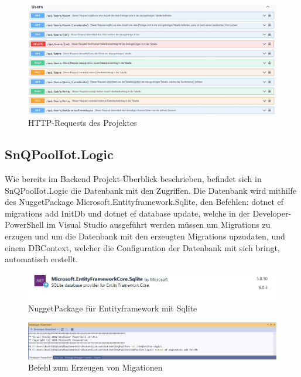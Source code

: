\begin{figure}[H]
    \centering
    \includegraphics[width=1.6\textwidth]{pics/WebApiRequests9.JPG}
    \caption{HTTP-Requests des Projektes}
\end{figure}


\subsection{SnQPoolIot.Logic}
Wie  bereits im Backend Projekt-Überblick beschrieben, befindet sich in SnQPoolIot.Logic die Datenbank mit den Zugriffen.
Die Datenbank wird mithilfe des NuggetPackage Microsoft.Entityframework.Sqlite, den Befehlen:
dotnet ef migrations add InitDb und dotnet ef database update, welche in der Developer-PowerShell 
im Visual Studio ausgeführt werden müssen um Migrations zu erzugen und um die Datenbank mit den erzeugten Migrations upzudaten, 
und einem DBContext, welcher die Configuration der Datenbank mit sich bringt, automatisch erstellt. 

\begin{figure}[H]
    \centering
    \includegraphics[width=1\textwidth]{pics/EntityFrameworkSqlLiteNuggetPackage.JPG}
    \caption{NuggetPackage für Entityframework mit Sqlite}
\end{figure}


\begin{figure}[H]
    \centering
    \includegraphics[width=1\textwidth]{pics/DeveloperPowerShellMigration.JPG}
    \caption{Befehl zum Erzeugen von Migationen}
\end{figure}

